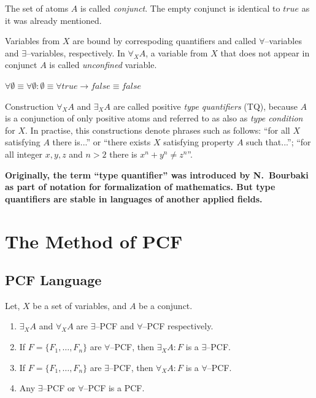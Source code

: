 \documentclass[runningheads,a4paper]{llncs}
\begin{document}
The set of atoms $A$ is called {\em conjunct}. The empty conjunct is identical to $true$ as it was already mentioned.

Variables from $X$ are bound by correspoding quantifiers and called $\forall$--variables and $\exists$--variables, respectively. In $\forall_XA$, a variable from $X$ that does not appear in conjunct $A$ is called {\em unconfined} variable.

$\forall \emptyset \equiv \forall \emptyset\colon\emptyset \equiv \forall true \rightarrow false \equiv false$

Construction $\forall_XA$ and $\exists_XA$ are called positive \emph{type quantifiers} (TQ), because $A$ is a conjunction of only positive atoms and referred to as also as \emph{type condition} for $X$. In practise, this constructions denote phrases such as follows: ``for all $X$ satisfying $A$ there is...'' or ``there exists $X$ satisfying property $A$ such that...''; ``for all integer $x,y,z$ and $n>2$ there is $x^n + y^n \ne z^n$''.

\textbf{Originally, the term ``type quantifier'' was introduced by N.~Bourbaki \cite{Bourbaki} as part of notation for formalization of mathematics. But type quantifiers are stable in languages of another applied fields.}

\section{The Method of PCF}

\subsection{PCF Language}

\begin{definition}
\label{def:pcf}
Let, $X$ be a set of variables, and $A$ be a conjunct.
\begin{enumerate}

\item $\exists_XA$ and $\forall_XA$ are $\exists$--PCF and $\forall$--PCF respectively.

\item If $F = \{F_1,\ldots,F_n\}$ are $\forall$--PCF, then $\exists_XA\colon F$ is a $\exists$--PCF.

\item If $F = \{F_1,\ldots,F_n\}$ are $\exists$--PCF, then $\forall_XA\colon F$ is a $\forall$--PCF.

\item Any $\exists$--PCF or $\forall$--PCF is a PCF.
\end{enumerate}
\end{definition}
\end{document}
